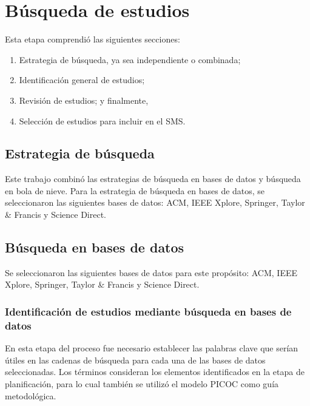 \section{Búsqueda de estudios}

Esta etapa comprendió las siguientes secciones: 
\begin{enumerate}
  \item Estrategia de búsqueda, ya sea independiente o combinada;
  \item Identificación general de estudios;
  \item Revisión de estudios; y finalmente,
  \item Selección de estudios para incluir en el SMS.\@
\end{enumerate}

\subsection{Estrategia de búsqueda}

Este trabajo combinó las estrategias de búsqueda en bases de datos y búsqueda en bola de nieve. 
Para la estrategia de búsqueda en bases de datos, se seleccionaron las siguientes bases de datos: ACM, IEEE Xplore, Springer, Taylor \& Francis y Science Direct.

\subsection{Búsqueda en bases de datos}\label{subsec:busquedaBasesDatos}
Se seleccionaron las siguientes bases de datos para este propósito: ACM, IEEE Xplore, Springer, Taylor \& Francis y Science Direct.

\subsubsection{Identificación de estudios mediante búsqueda en bases de datos}\label{subsubsec:identificacionEstudios}
En esta etapa del proceso fue necesario establecer las palabras clave que serían útiles en las cadenas de búsqueda para cada una de las bases de datos seleccionadas. 
Los términos consideran los elementos identificados en la etapa de planificación, para lo cual también se utilizó el modelo PICOC como guía metodológica.

